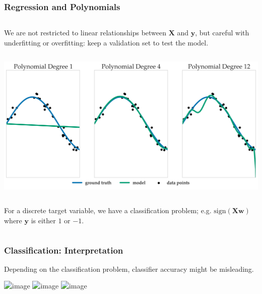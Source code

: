 \documentclass[11pt]{beamer}
\begin{document}
\begin{frame}[t]
  \frametitle{Regression and Polynomials}
  \begin{columns}
    \begin{column}{1.1\textwidth}
      We are not restricted to linear relationships between \(\mathbf{X}\) and
      \(\mathbf{y}\), but careful with underfitting or overfitting: keep a
      validation set to test the model.
    \end{column}
  \end{columns}
  \begin{center}
    \includegraphics[scale=0.36]{figures/linear_model_underf_overf.png}
  \end{center}
  \begin{columns}
    \begin{column}{1.1\textwidth}
      For a discrete target variable, we have a classification problem; e.g.
      \(\mathrm{sign}\left(\mathbf{Xw}\right)\) where $\mathbf{y}$ is either $1$
      or $-1$.
    \end{column}
  \end{columns}
\end{frame}
\begin{frame}
  \frametitle{Classification: Interpretation}
  Depending on the classification problem, classifier accuracy might be
  misleading. 
  \begin{center}
    \includegraphics<1>[scale=0.22]{figures/moons_circles_linear_clf_1.png}
    \includegraphics<2>[scale=0.22]{figures/moons_circles_linear_clf_2.png}
    \includegraphics<3>[scale=0.22]{figures/moons_circles_linear_clf.png}
  \end{center}
\end{frame}
\end{document}
